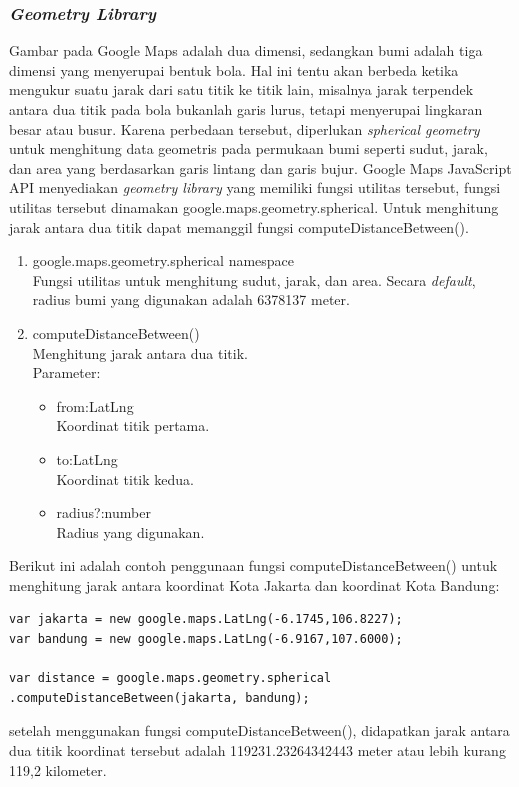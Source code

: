 \subsubsection{\textit{Geometry Library}}
Gambar pada Google Maps adalah dua dimensi, sedangkan bumi adalah tiga dimensi
yang menyerupai bentuk bola. Hal ini tentu akan berbeda ketika mengukur suatu
jarak dari satu titik ke titik lain, misalnya jarak terpendek antara dua titik 
pada bola bukanlah garis lurus, tetapi menyerupai lingkaran besar atau busur. 
Karena perbedaan tersebut, diperlukan \textit{spherical geometry} untuk
menghitung data geometris pada permukaan bumi seperti sudut, jarak, dan area 
yang berdasarkan garis lintang dan garis bujur. Google Maps JavaScript API 
menyediakan \textit{geometry library} yang memiliki fungsi utilitas tersebut,
fungsi utilitas tersebut dinamakan google.maps.geometry.spherical. Untuk
menghitung jarak antara dua titik dapat memanggil fungsi
computeDistanceBetween().
\begin{enumerate}
  \item google.maps.geometry.spherical namespace \\
  Fungsi utilitas untuk menghitung sudut, jarak, dan area. Secara
  \textit{default}, radius bumi yang digunakan adalah 6378137 meter.
  
  \item computeDistanceBetween() \\
  Menghitung jarak antara dua titik.\\
  Parameter:
  \begin{itemize}
    \item from:LatLng\\
    Koordinat titik pertama.
    
    \item to:LatLng\\
    Koordinat titik kedua.
    
    \item radius?:number\\
    Radius yang digunakan.
  \end{itemize}
\end{enumerate}
Berikut ini adalah contoh penggunaan fungsi computeDistanceBetween() untuk
menghitung jarak antara koordinat Kota Jakarta dan koordinat Kota Bandung:
\begin{verbatim}
var jakarta = new google.maps.LatLng(-6.1745,106.8227);
var bandung = new google.maps.LatLng(-6.9167,107.6000);

var distance = google.maps.geometry.spherical
.computeDistanceBetween(jakarta, bandung);
\end{verbatim}
setelah menggunakan fungsi computeDistanceBetween(), didapatkan jarak antara dua
titik koordinat tersebut adalah 119231.23264342443 meter atau lebih kurang
119,2 kilometer.
 
